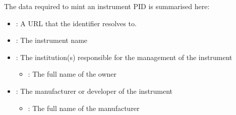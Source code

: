 \documentclass[letterpaper,10pt,english]{sphinxmanual}
\begin{document}
\sphinxAtStartPar
The data required to mint an instrument PID is summarised here:
\begin{itemize}
\item {} 
\sphinxAtStartPar
{}: A URL that the identifier resolves to.

\item {} 
\sphinxAtStartPar
{}: The instrument name

\item {} 
\sphinxAtStartPar
{}: The institution(s) responsible for the management of the instrument
\begin{itemize}
\item {} 
\sphinxAtStartPar
{}: The full name of the owner

\end{itemize}

\item {} 
\sphinxAtStartPar
{}: The manufacturer or developer of the instrument
\begin{itemize}
\item {} 
\sphinxAtStartPar
{}: The full name of the manufacturer

\end{itemize}

\end{itemize}
\end{document}
